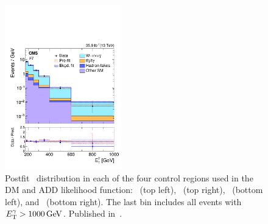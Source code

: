 \begin{figure}[htbp]
\begin{center}
    \includegraphics[width=0.45\textwidth]{figures/exo16053/Figure_005-d.pdf}
    \caption{
      Postfit \ETgamma\ distribution in each of the four control regions used in the DM and ADD likelihood function:
      \Pe\Pe\Pgamma\ (top left), \Pmu\Pmu\Pgamma\ (top right), \Pe\Pgamma\ (bottom left), and
      \Pmu\Pgamma\ (bottom right). The last bin includes all events with $\ETgamma > 1000\unit{GeV}$.
      Published in~\cite{ref:JHEP02(2019)074}.
    }
    \label{fig:postfitDM_CR}
  \end{center}
\end{figure}

